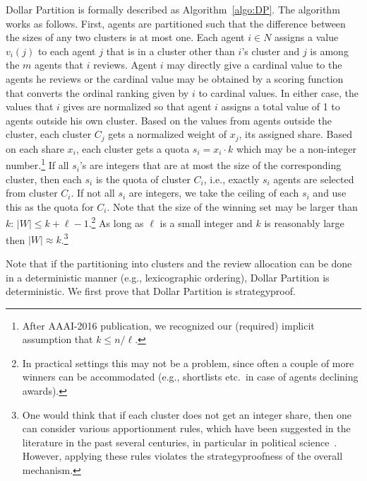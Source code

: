 \documentclass[letterpaper]{article}
\begin{document}
Dollar Partition is formally described as Algorithm~\ref{algo:DP}. The algorithm works as follows. First, agents are partitioned such that the difference between the sizes of any two clusters is at most one. Each agent $i\in N$ assigns a value $v_i(j)$ to each agent $j$ that is in a cluster other than $i$'s cluster and $j$ is among the $m$ agents that $i$ reviews. Agent $i$ may directly give a cardinal value to the agents he reviews or the cardinal value may be obtained by a scoring function that converts the ordinal ranking given by $i$ to cardinal values. In either case, the values that $i$ gives are normalized so that agent $i$ assigns a total value of 1 to agents outside his own cluster. Based on the values from agents outside the cluster, each cluster $C_j$ gets a normalized weight of $x_j$, its assigned share. Based on each share $x_i$, each cluster gets a quota $s_i=x_i \cdot k$ which may be a non-integer number.\footnote{After AAAI-2016 publication, we recognized our (required) implicit assumption that $k \leq n/\ell$.}
	If all $s_i$'s are integers that are at most the size of the corresponding cluster, then each $s_i$ is the quota of cluster $C_i$, i.e., exactly $s_i$ agents are selected from cluster $C_i$.
If not all $s_i$ are integers, we take the ceiling of each $s_i$ and use this as the quota for $C_i$.
Note that the size of the winning set may be larger than $k$: $|W| \leq k+\ell-1$.\footnote{In practical settings this may not be a problem, since often a couple of more winners can be accommodated (e.g., shortlists etc.\ in case of agents declining awards).}
As long as $\ell$ is a small integer and $k$ is reasonably large then $|W| \approx k$.\footnote{One would think that if each cluster does not get an integer share, then one can consider various apportionment rules, which have been suggested in the literature in the past several centuries, in particular in political science~\cite{Youn94a}. However, applying these rules violates the strategyproofness of the overall mechanism.}



Note that if the partitioning into clusters and the review allocation can be done in a deterministic manner (e.g., lexicographic ordering), Dollar Partition is deterministic. We first prove that Dollar Partition is strategyproof.
\end{document}
